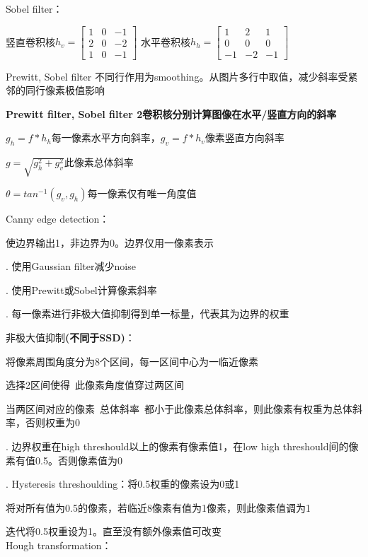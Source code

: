 \documentclass[UTF8]{ctexart}
\begin{document}
  Sobel filter：

  \quad 竖直卷积核$h_v = \begin{bmatrix}
    1 & 0 & -1 \\
    2 & 0 & -2 \\
    1 & 0 & -1
    \end{bmatrix}$
    水平卷积核$h_h = \begin{bmatrix}
      1 & 2 & 1 \\
      0 & 0 & 0 \\
      -1 & -2 & -1
      \end{bmatrix}$

  Prewitt, Sobel filter 不同行作用为smoothing。从图片多行中取值，减少斜率受紧邻的同行像素极值影响

  \textbf{Prewitt filter, Sobel filter 2卷积核分别计算图像在水平/竖直方向的斜率}

  \quad $g_h = f * h_h$每一像素水平方向斜率，$g_v = f * h_v$像素竖直方向斜率

  \quad $g = \sqrt{g_h^2 + g_v^2}$此像素总体斜率

  \quad $\theta = tan^{-1}(g_v, g_h)$每一像素仅有唯一角度值

  Canny edge detection：

  \quad 使边界输出1，非边界为0。边界仅用一像素表示

  . 使用Gaussian filter减少noise

  . 使用Prewitt或Sobel计算像素斜率

  . 每一像素进行非极大值抑制得到单一标量，代表其为边界的权重

  \quad \quad 非极大值抑制\textbf{(不同于SSD)}：

  \quad \quad \quad 将像素周围角度分为8个区间，每一区间中心为一临近像素

  \quad \quad \quad 选择2区间使得\ 此像素角度值穿过两区间

  \quad \quad \quad 当两区间对应的像素\ 总体斜率\ 都小于此像素总体斜率，则此像素有权重为总体斜率，否则权重为0

  . 边界权重在high threshould以上的像素有像素值1，在low high threshould间的像素有值0.5。否则像素值为0

  . Hysteresis threshoulding：将0.5权重的像素设为0或1
  
  \quad \quad 将对所有值为0.5的像素，若临近8像素有值为1像素，则此像素值调为1

  \quad \quad 迭代将0.5权重设为1。直至没有额外像素值可改变\\
Hough transformation：
\end{document}
